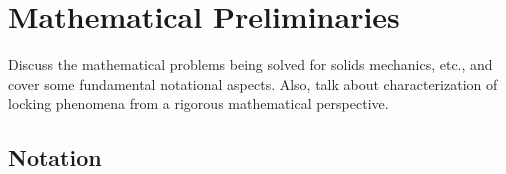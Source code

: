 \chapter{Mathematical Preliminaries}
%
Discuss the mathematical problems being solved for solids mechanics, etc., and cover some fundamental notational aspects. Also, talk about characterization of locking phenomena from a rigorous mathematical perspective.

\section{Notation}

\section{}
